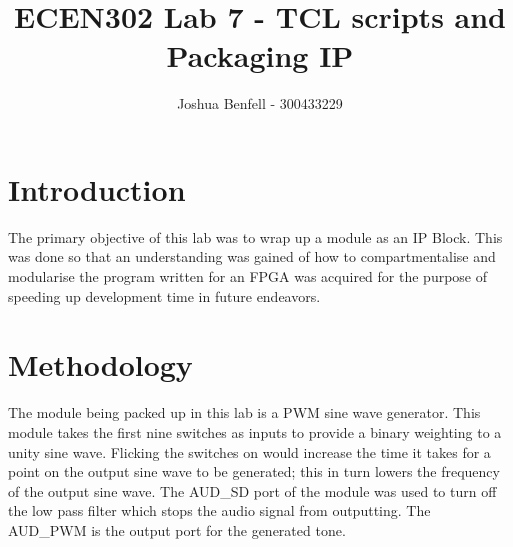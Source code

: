 \documentclass[a4paper, 12pt]{article}
\title{ECEN302 Lab 7 - TCL scripts and Packaging IP}
\author{Joshua Benfell - 300433229}
\begin{document}
	\maketitle
	
	\section{Introduction}
		The primary objective of this lab was to wrap up a module as an IP Block. This was done so that an understanding was gained of how to compartmentalise and modularise the program written for an FPGA was acquired for the purpose of speeding up development time in future endeavors. 
	\section{Methodology}
		The module being packed up in this lab is a PWM sine wave generator. This module takes the first nine switches as inputs to provide a binary weighting to a unity sine wave. Flicking the switches on would increase the time it takes for a point on the output sine wave to be generated; this in turn lowers the frequency of the output sine wave. The AUD\_SD port of the module was used to turn off the low pass filter which stops the audio signal from outputting. The AUD\_PWM is the output port for the generated tone. 

\end{document}
